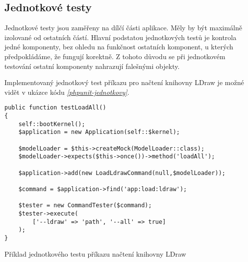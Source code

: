 \subsection{Jednotkové testy}
Jednotkové testy jsou zaměřeny na dílčí části aplikace. Měly by být maximálně izolované od ostatních částí. Hlavní podstatou jednotkových testů je kontrola jedné komponenty, bez ohledu na funkčnost ostatních komponent, u kterých předpokládáme, že fungují korektně. Z tohoto důvodu se při jednotkovém testování ostatní komponenty nahrazují falešnými objekty. \autocite{zdrojak:testy}

Implementovaný jednotkový test příkazu pro načtení knihovny LDraw je možné vidět v ukázce kódu \emph{\ref{phpunit-jednotkovy}}.

\begin{listing}[htbp]
        \begin{verbatim}
public function testLoadAll()
{
    self::bootKernel();
    $application = new Application(self::$kernel);

    $modelLoader = $this->createMock(ModelLoader::class);
    $modelLoader->expects($this->once())->method('loadAll');

    $application->add(new LoadLdrawCommand(null,$modelLoader));

    $command = $application->find('app:load:ldraw');

    $tester = new CommandTester($command);
    $tester->execute(
        ['--ldraw' => 'path', '--all' => true]
    );
}
        \end{verbatim}
    \caption{Příklad jednotkového testu příkazu načtení knihovny LDraw\label{phpunit-jednotkovy}}
\end{listing}